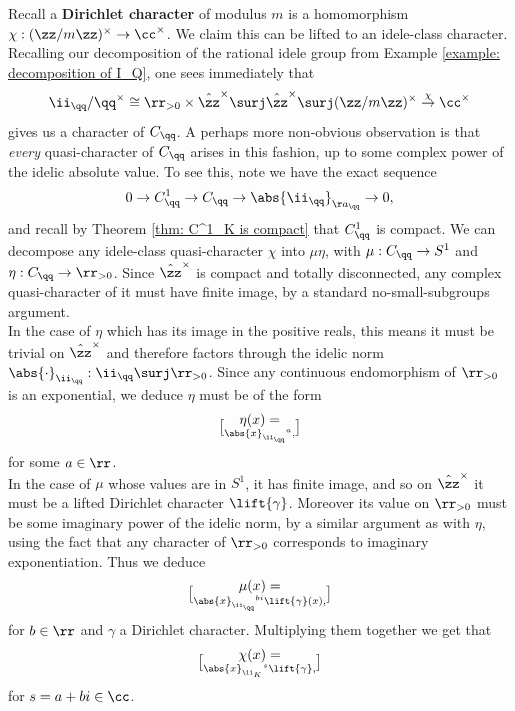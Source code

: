 \documentclass[11pt, x11names, openany]{book}
\begin{document}
\begin{example}
\label{example: Dirichlet char as idele-class character}
Recall a \textbf{Dirichlet character} of modulus $m$ is a homomorphism $\chi: (\zz/m\zz)^\times \to \cc^\times$. We claim this can be lifted to an idele-class character. Recalling our decomposition of the rational idele group from Example \ref{example: decomposition of I_Q}, one sees immediately that
\begin{equation*}
    \ii_\qq/\qq^\times \cong \rr_{> 0} \times \hat{\zz}^\times \surj \hat{\zz}^\times \surj (\zz/m\zz)^\times \overset{\chi}{\to} \cc^\times
\end{equation*}
gives us a character of $C_\qq$. A perhaps more non-obvious observation is that \textit{every} quasi-character of $C_\qq$ arises in this fashion, up to some complex power of the idelic absolute value. To see this, note we have the exact sequence
\begin{equation*}
    0 \to C^1_\qq \to C_\qq \to \abs{\ii_\qq}_{\aa_\qq} \to 0, 
\end{equation*}
and recall by Theorem \ref{thm: C^1_K is compact} that $C^1_\qq$ is compact. We can decompose any idele-class quasi-character $\chi$ into $\mu \eta$, with $\mu: C_\qq \to S^1$ and $\eta: C_\qq \to \rr_{> 0}$. Since $\hat{\zz}^\times$ is compact and totally disconnected, any complex quasi-character of it must have finite image, by a standard no-small-subgroups argument.\\
In the case of $\eta$ which has its image in the positive reals, this means it must be trivial on $\hat{\zz}^\times$ and therefore factors through the idelic norm $\abs{\cdot}_{\ii_\qq} : \ii_\qq \surj \rr_{> 0}$. Since any continuous endomorphism of $\rr_{> 0}$ is an exponential, we deduce $\eta$ must be of the form
\begin{equation*}
    \eta(x) = \brack{\abs{x}_{\ii_\qq}}^a,
\end{equation*}
for some $a \in \rr$.\\
In the case of $\mu$ whose values are in $S^1$, it has finite image, and so on $\hat{\zz}^\times$ it must be a lifted Dirichlet character $\lift{\gamma}$. Moreover its value on $\rr_{> 0}$ must be some imaginary power of the idelic norm, by a similar argument as with $\eta$, using the fact that any character of $\rr_{> 0}$ corresponds to imaginary exponentiation. Thus we deduce
\begin{equation*}
    \mu(x) = \brack{\abs{x}_{\ii_\qq}}^{bi} \lift{\gamma}(x),
\end{equation*}
for $b \in \rr$ and $\gamma$ a Dirichlet character. Multiplying them together we get that 
\begin{equation*}
    \chi(x) = \brack{\abs{x}_{\ii_K}}^s \lift{\gamma},
\end{equation*}
for $s = a + bi \in \cc$.
\end{example}
\end{document}
